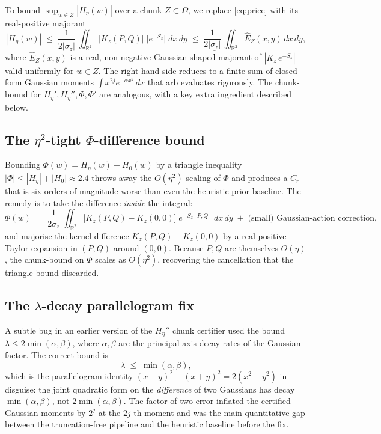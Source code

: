 \documentclass[11pt]{article}
\theoremstyle{definition}
\newcommand{\R}{\mathbb{R}}
\newcommand{\Heta}{H_{\eta}}
\newcommand{\HetaP}{H_{\eta}'}
\newcommand{\HetaPP}{H_{\eta}''}
\newcommand{\Om}{\Omega}
\newcommand{\abslb}[1]{\underline{|#1|}}
\newcommand{\absub}[1]{\overline{|#1|}}
\begin{document}
To bound $\sup_{w\in Z}|\Heta(w)|$ over a chunk $Z\subset\Om$, we replace
\eqref{eq:price} with its real-positive majorant
\begin{equation}\label{eq:majorant}
   |\Heta(w)|
   \;\le\;
   \frac{1}{2\absub{\sigma_z}}\,\iint_{\R^2}
       \bigl|K_z(P,Q)\bigr|\;
       \bigl|e^{-S_z}\bigr|\;dx\,dy
   \;\le\;
   \frac{1}{2\abslb{\sigma_z}}\,\iint_{\R^2}
       \widehat E_Z(x,y)\,dx\,dy,
\end{equation}
where $\widehat E_Z(x,y)$ is a real, non-negative Gaussian-shaped majorant of
$|K_z\,e^{-S_z}|$ valid uniformly for $w\in Z$. The right-hand side reduces to a finite
sum of closed-form Gaussian moments
\(
   \int x^{2j} e^{-\alpha x^2}\,dx
\)
that arb evaluates rigorously. The chunk-bound for $\HetaP, \HetaPP, \Phi, \Phi'$ are
analogous, with a key extra ingredient described below.

\subsection{The $\eta^2$-tight $\Phi$-difference bound}

Bounding $\Phi(w)=\Heta(w)-H_0(w)$ by a triangle inequality
$|\Phi|\le |\Heta|+|H_0|\approx 2.4$ throws away the $O(\eta^2)$ scaling of $\Phi$
and produces a $C_r$ that is six orders of magnitude worse than even the heuristic
prior baseline. The remedy is to take the difference \emph{inside} the integral:
\begin{equation}\label{eq:phi-diff}
   \Phi(w)
   \;=\;
   \frac{1}{2\sigma_z}\,\iint_{\R^2}
       \bigl[ K_z(P,Q) - K_z(0,0) \bigr]\;e^{-S_z[P,Q]}\,dx\,dy
       \;+\;\text{(small) Gaussian-action correction},
\end{equation}
and majorise the kernel difference $K_z(P,Q)-K_z(0,0)$ by a real-positive Taylor
expansion in $(P,Q)$ around $(0,0)$. Because $P,Q$ are themselves $O(\eta)$, the
chunk-bound on $\Phi$ scales as $O(\eta^2)$, recovering the cancellation that the
triangle bound discarded.

\subsection{The $\lambda$-decay parallelogram fix}\label{sec:lambda-fix}

A subtle bug in an earlier version of the $\HetaPP$ chunk certifier used the bound
$\lambda \le 2\min(\alpha,\beta)$, where $\alpha,\beta$ are the principal-axis decay
rates of the Gaussian factor. The correct bound is
\begin{equation}\label{eq:lambda-fix}
   \lambda \;\le\; \min(\alpha,\beta),
\end{equation}
which is the parallelogram identity
$(x-y)^2 + (x+y)^2 = 2(x^2+y^2)$ in disguise: the joint quadratic form on the
\emph{difference} of two Gaussians has decay $\min(\alpha,\beta)$, not
$2\min(\alpha,\beta)$. The factor-of-two error inflated the certified Gaussian moments
by $2^{j}$ at the $2j$-th moment and was the main quantitative gap between the
truncation-free pipeline and the heuristic baseline before the fix.
\end{document}
